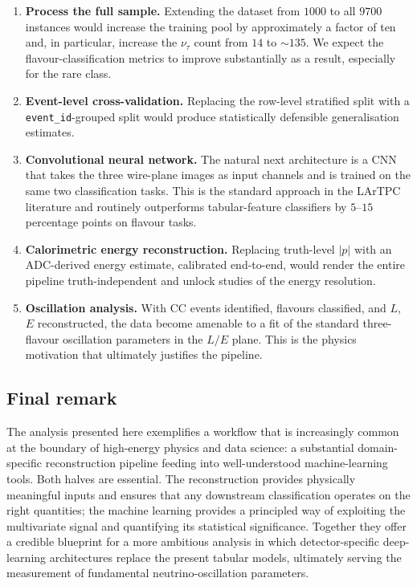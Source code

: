 \documentclass[11pt,a4paper]{article}
\begin{document}
\begin{enumerate}[leftmargin=*]
\item \textbf{Process the full sample.}  Extending the dataset from $\num{1000}$ to all $\num{9700}$ instances would increase the training pool by approximately a factor of ten and, in particular, increase the $\nu_\tau$ count from $\num{14}$ to $\sim\num{135}$.  We expect the flavour-classification metrics to improve substantially as a result, especially for the rare class.
\item \textbf{Event-level cross-validation.}  Replacing the row-level stratified split with a \texttt{event\_id}-grouped split would produce statistically defensible generalisation estimates.
\item \textbf{Convolutional neural network.}  The natural next architecture is a CNN that takes the three wire-plane images as input channels and is trained on the same two classification tasks.  This is the standard approach in the LArTPC literature and routinely outperforms tabular-feature classifiers by $5$--$15$ percentage points on flavour tasks.
\item \textbf{Calorimetric energy reconstruction.}  Replacing truth-level $|p|$ with an ADC-derived energy estimate, calibrated end-to-end, would render the entire pipeline truth-independent and unlock studies of the energy resolution.
\item \textbf{Oscillation analysis.}  With CC events identified, flavours classified, and $L$, $E$ reconstructed, the data become amenable to a fit of the standard three-flavour oscillation parameters in the $L/E$ plane.  This is the physics motivation that ultimately justifies the pipeline.
\end{enumerate}

\subsection{Final remark}
The analysis presented here exemplifies a workflow that is increasingly common at the boundary of high-energy physics and data science: a substantial domain-specific reconstruction pipeline feeding into well-understood machine-learning tools.  Both halves are essential.  The reconstruction provides physically meaningful inputs and ensures that any downstream classification operates on the right quantities; the machine learning provides a principled way of exploiting the multivariate signal and quantifying its statistical significance.  Together they offer a credible blueprint for a more ambitious analysis in which detector-specific deep-learning architectures replace the present tabular models, ultimately serving the measurement of fundamental neutrino-oscillation parameters.
\end{document}
